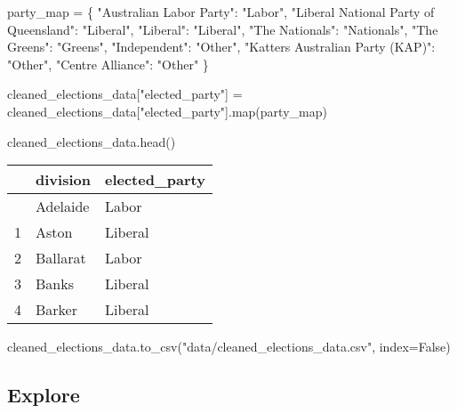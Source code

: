 \documentclass[
  letterpaper,
  DIV=11,
  numbers=noendperiod]{scrreprt}
\newenvironment{Shaded}{\begin{snugshade}}{\end{snugshade}}
\newcommand{\BuiltInTok}[1]{\textcolor[rgb]{0.00,0.23,0.31}{#1}}
\newcommand{\NormalTok}[1]{\textcolor[rgb]{0.00,0.23,0.31}{#1}}
\newcommand{\OperatorTok}[1]{\textcolor[rgb]{0.37,0.37,0.37}{#1}}
\newcommand{\StringTok}[1]{\textcolor[rgb]{0.13,0.47,0.30}{#1}}
\newcommand{\VariableTok}[1]{\textcolor[rgb]{0.07,0.07,0.07}{#1}}
\begin{document}
\begin{Shaded}
\begin{Highlighting}[]
\NormalTok{party\_map }\OperatorTok{=}\NormalTok{ \{}
    \StringTok{"Australian Labor Party"}\NormalTok{: }\StringTok{"Labor"}\NormalTok{,}
    \StringTok{"Liberal National Party of Queensland"}\NormalTok{: }\StringTok{"Liberal"}\NormalTok{,}
    \StringTok{"Liberal"}\NormalTok{: }\StringTok{"Liberal"}\NormalTok{,}
    \StringTok{"The Nationals"}\NormalTok{: }\StringTok{"Nationals"}\NormalTok{,}
    \StringTok{"The Greens"}\NormalTok{: }\StringTok{"Greens"}\NormalTok{,}
    \StringTok{"Independent"}\NormalTok{: }\StringTok{"Other"}\NormalTok{,}
    \StringTok{"Katter\textquotesingle{}s Australian Party (KAP)"}\NormalTok{: }\StringTok{"Other"}\NormalTok{,}
    \StringTok{"Centre Alliance"}\NormalTok{: }\StringTok{"Other"}
\NormalTok{\}}

\NormalTok{cleaned\_elections\_data[}\StringTok{"elected\_party"}\NormalTok{] }\OperatorTok{=}\NormalTok{ cleaned\_elections\_data[}\StringTok{"elected\_party"}\NormalTok{].}\BuiltInTok{map}\NormalTok{(party\_map)}

\NormalTok{cleaned\_elections\_data.head()}
\end{Highlighting}
\end{Shaded}

\begin{longtable}[]{@{}lll@{}}
\toprule\noalign{}
& division & elected\_party \\
\midrule\noalign{}
\endhead
\bottomrule\noalign{}
\endlastfoot
0 & Adelaide & Labor \\
1 & Aston & Liberal \\
2 & Ballarat & Labor \\
3 & Banks & Liberal \\
4 & Barker & Liberal \\
\end{longtable}

\begin{Shaded}
\begin{Highlighting}[]
\NormalTok{cleaned\_elections\_data.to\_csv(}\StringTok{"data/cleaned\_elections\_data.csv"}\NormalTok{, index}\OperatorTok{=}\VariableTok{False}\NormalTok{)}
\end{Highlighting}
\end{Shaded}

\hypertarget{explore}{%
\subsection{Explore}\label{explore}}
\end{document}
